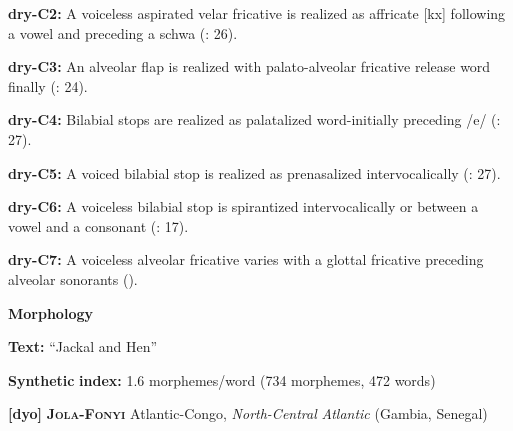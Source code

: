 \begin{styleBody}
\textbf{dry-C2:} A voiceless aspirated velar fricative is realized as affricate [kx] following a vowel and preceding a schwa (\citealt{KotapishKotapish1978}: 26).
\end{styleBody}

\begin{styleBody}
\textbf{dry-C3:} An alveolar flap is realized with palato-alveolar fricative release word finally (\citealt{KotapishKotapish1978}: 24).
\end{styleBody}

\begin{styleBody}
\textbf{dry-C4:} Bilabial stops are realized as palatalized word-initially preceding /e/ (\citealt{KotapishKotapish1978}: 27).
\end{styleBody}

\begin{styleBody}
\textbf{dry-C5:} A voiced bilabial stop is realized as prenasalized intervocalically (\citealt{KotapishKotapish1978}: 27).
\end{styleBody}

\begin{styleBody}
\textbf{dry-C6:} A voiceless bilabial stop is spirantized intervocalically or between a vowel and a consonant (\citealt{KotapishKotapish1978}: 17).
\end{styleBody}

\begin{styleBody}
\textbf{dry-C7:} A voiceless alveolar fricative varies with a glottal fricative preceding alveolar sonorants (\citealt{KotapishKotapish1978}).
\end{styleBody}

\begin{styleBody}
\textbf{Morphology}
\end{styleBody}

\begin{styleBody}
\textbf{Text:} “Jackal and Hen” \citep[180-192]{Dhakal2012}
\end{styleBody}

\begin{styleBody}
\textbf{Synthetic} \textbf{index:} 1.6 morphemes/word (734 morphemes, 472 words)
\end{styleBody}

\begin{styleBody}
\textbf{[dyo]}   \textbf{\textsc{Jola-Fonyi}}  Atlantic-Congo, \textit{North-Central} \textit{Atlantic} (Gambia, Senegal)
\end{styleBody}

